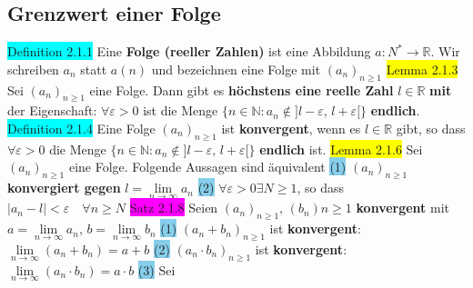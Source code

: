 \documentclass[landscape, 10pt]{article}
\newcommand{\R}{\mathbb{R}}
\newcommand{\N}{\mathbb{N}}
\begin{document}
\begin{multicols}{3}
\subsection{Grenzwert einer Folge}
\colorbox{cyan}{Definition 2.1.1} Eine \textbf{Folge (reeller Zahlen)} ist 
                eine Abbildung $a:N^{*}\longrightarrow\R$. 
                Wir schreiben $a_n$ statt $a(n)$ und 
         bezeichnen eine Folge mit 
                \textcolor{NavyBlue}{$(a_n)_{n\geqslant 1}$}
\colorbox{yellow}{Lemma 2.1.3} Sei $(a_n)_{n\geqslant 1}$ eine 
                Folge. Dann gibt es \textbf{höchstens eine reelle Zahl} 
                \textcolor{NavyBlue}{$l\in\R$} 
                \textbf{mit} der Eigenschaft: 
         \textcolor{NavyBlue}{$\forall\varepsilon >0$} ist die Menge 
                \textcolor{NavyBlue}{
                $\{n\in\N:a_n\notin ]l-\varepsilon,\,l+\varepsilon[\}$} 
                \textbf{endlich}.
\colorbox{cyan}{Definition 2.1.4} Eine Folge $(a_n)_{n\geqslant 1}$ ist 
                \textbf{konvergent}, wenn es \textcolor{NavyBlue}{$l\in\R$} 
                gibt, so dass 
                \textcolor{NavyBlue}{$\forall\varepsilon >0$} die Menge 
         \textcolor{NavyBlue}{
                $\{n\in\N:a_n\notin ]l-\varepsilon,\, l+\varepsilon[\}$} 
                \textbf{endlich} ist.
\colorbox{yellow}{Lemma 2.1.6} Sei $(a_n)_{n\geqslant 1}$ eine Folge. 
                Folgende Aussagen sind äquivalent
         \colorbox{SkyBlue}{(1)} \textcolor{NavyBlue}{$(a_n)_{n\geqslant 1}$} 
                \textbf{konvergiert gegen} 
                \textcolor{NavyBlue}{$l=\lim\limits_{n\to\infty}a_n$}
                \quad\colorbox{SkyBlue}{(2)} 
                \textcolor{NavyBlue}{$\forall\varepsilon >0\exists N\geqslant 1$}, 
                so dass 
                \textcolor{NavyBlue}{$|a_n-l|<\varepsilon \quad\forall n\geqslant N$}
\colorbox{magenta}{Satz 2.1.8} Seien 
                \textcolor{NavyBlue}{$(a_n)_{n\geqslant 1},\,(b_n){n\geqslant 1}$} 
                \textbf{konvergent} mit 
                \textcolor{NavyBlue}{$a=\lim\limits_{n\to\infty}a_n,\,
                b=\lim\limits_{n\to\infty}b_n$}
         \colorbox{SkyBlue}{(1)} 
                \textcolor{NavyBlue}{$(a_n+b_n)_{n\geqslant 1}$} ist \textbf{konvergent}: 
                \textcolor{NavyBlue}{$\lim\limits_{n\to\infty}(a_n+b_n)=a+b$}
                \quad \colorbox{SkyBlue}{(2)} 
                \textcolor{NavyBlue}{$(a_n\cdot b_n)_{n\geqslant 1}$} ist \textbf{konvergent}: 
                \textcolor{NavyBlue}{$\lim\limits_{n\to\infty}(a_n\cdot b_n)=a\cdot b$}
         \colorbox{SkyBlue}{(3)} Sei 

\end{multicols}
\end{document}
